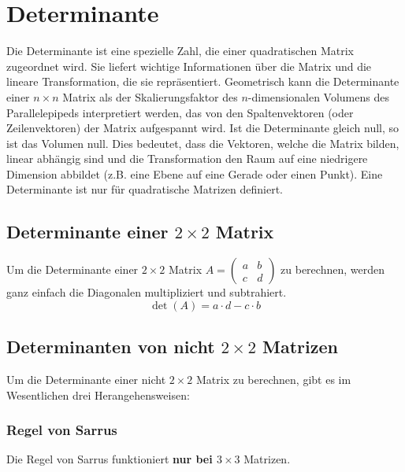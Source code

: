\chapter{Determinante}
\label{determinante}

Die Determinante ist eine spezielle Zahl, die einer quadratischen Matrix zugeordnet wird. Sie liefert wichtige Informationen über die Matrix und die lineare Transformation, die sie repräsentiert. Geometrisch kann die Determinante einer $n \times n$ Matrix als der Skalierungsfaktor des $n$-dimensionalen Volumens des Parallelepipeds interpretiert werden, das von den Spaltenvektoren (oder Zeilenvektoren) der Matrix aufgespannt wird. Ist die Determinante gleich null, so ist das Volumen null. Dies bedeutet, dass die Vektoren, welche die Matrix bilden, linear abhängig sind und die Transformation den Raum auf eine niedrigere Dimension abbildet (z.B. eine Ebene auf eine Gerade oder einen Punkt). Eine Determinante ist nur für quadratische Matrizen definiert.

\section{Determinante einer $2 \times 2$ Matrix}

Um die Determinante einer $2 \times 2$ Matrix $A = \begin{pmatrix} a & b \\ c & d \end{pmatrix}$ zu berechnen, werden ganz einfach die Diagonalen multipliziert und subtrahiert.
\[
    \det(A) = a \cdot d - c \cdot b
\]

\section{Determinanten von nicht $2 \times 2$ Matrizen}

Um die Determinante einer nicht $2 \times 2$ Matrix zu berechnen, gibt es im Wesentlichen drei Herangehensweisen:

\subsection{Regel von Sarrus}

Die Regel von Sarrus funktioniert \textbf{nur bei $3 \times 3$} Matrizen.

